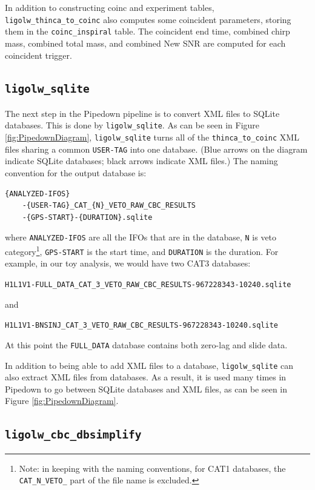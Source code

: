 In addition to constructing coinc and experiment tables,
\texttt{ligolw\_thinca\_to\_coinc} also computes some coincident parameters,
storing them in the \texttt{coinc\_inspiral} table. The coincident end time,
combined chirp mass, combined total mass, and combined New \ac{SNR} are
computed for each coincident trigger.

\subsection{\texttt{ligolw\_sqlite}}
\label{sec:ligolw_sqlite}

The next step in the Pipedown pipeline is to convert XML files to SQLite
databases. This is done by \texttt{ligolw\_sqlite}. As can be seen in Figure
\ref{fig:PipedownDiagram}, \texttt{ligolw\_sqlite} turns all of the
\texttt{thinca\_to\_coinc} XML files sharing a common \texttt{USER-TAG} into
one database. (Blue arrows on the diagram indicate SQLite databases; black
arrows indicate XML files.) The naming convention for the output database is:
\begin{verbatim}
{ANALYZED-IFOS}
    -{USER-TAG}_CAT_{N}_VETO_RAW_CBC_RESULTS
    -{GPS-START}-{DURATION}.sqlite
\end{verbatim}
where \texttt{ANALYZED-IFOS} are all the \acp{IFO} that are in the database,
\texttt{N} is veto category\footnote{Note: in keeping with the \hipe naming
conventions, for CAT1 databases, the \texttt{CAT\_N\_VETO\_} part of the file
name is excluded.}, \texttt{GPS-START} is the \ihope start time, and
\texttt{DURATION} is the \ihope duration. For example, in our toy analysis, we
would have two CAT3 databases:
\begin{center}
\verb|H1L1V1-FULL_DATA_CAT_3_VETO_RAW_CBC_RESULTS-967228343-10240.sqlite|
\end{center}
and
\begin{center}
\verb|H1L1V1-BNSINJ_CAT_3_VETO_RAW_CBC_RESULTS-967228343-10240.sqlite|
\end{center}
At this point the \texttt{FULL\_DATA} database contains both zero-lag and slide data.

In addition to being able to add XML files to a database,
\texttt{ligolw\_sqlite} can also extract XML files from databases. As a result,
it is used many times in Pipedown to go between SQLite databases and XML files,
as can be seen in Figure \ref{fig:PipedownDiagram}.

\subsection{\texttt{ligolw\_cbc\_dbsimplify}}
\label{sec:dbsimplify}

